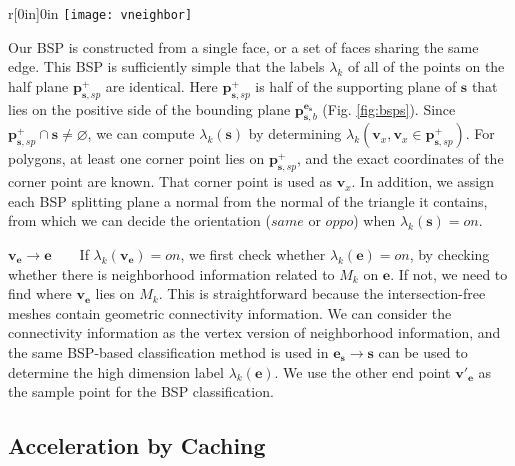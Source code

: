 %
\vspace{0.5em}
\begin{wrapfigure}{r}[0in]{0in}
 \texttt{[image: vneighbor]}
\end{wrapfigure}
Our BSP is constructed from a single face, or a set of faces sharing the same edge. This BSP is sufficiently simple that the labels $\lambda_k$ of all of the points on the half plane $\bm{p}_{\bm{s}, sp}^+$ are identical. Here $\bm{p}_{\bm{s}, sp}^+$ is half of the supporting plane of $\bm{s}$ that lies on the positive side of the bounding plane $\bm{p}_{\bm{s}, b}^{\bm{e}_{\bm{s}}}$ (Fig. \ref{fig:bsps}). Since $\bm{p}_{\bm{s}, sp}^+ \cap \bm{s} \neq \varnothing$, we can compute $\lambda_k(\bm{s})$ by determining $\lambda_k(\bm{v}_x, \bm{v}_x \in \bm{p}_{\bm{s}, sp}^+)$. For polygons, at least one corner point lies on $\bm{p}_{\bm{s}, sp}^+$, and the exact coordinates of the corner point are known. That corner point is used as $\bm{v}_x$. In addition, we assign each BSP splitting plane a normal from the normal of the triangle it contains, from which we can decide the orientation ($same$ or $oppo$) when $\lambda_k(\bm{s})=on$.


\noindent\textbf{$\bm{\bm{v}_{\bm{e}}\to e}$}~~~~If $\lambda_k(\bm{v}_{\bm{e}})=on$, we first check whether $\lambda_k(\bm{e}) = on$, by checking whether there is neighborhood information related to $M_k$ on $\bm{e}$. If not, we need to find where $\bm{v}_{\bm{e}}$ lies on $M_k$. This is straightforward because the intersection-free meshes contain geometric connectivity information. We can consider the connectivity information as the vertex version of neighborhood information, and the same BSP-based classification method is used in ${\bm{e}_{\bm{s}}\to \bm{s}}$ can be used to determine the high dimension label $\lambda_k(\bm{e})$. We use the other end point $\bm{v}'_{\bm{e}}$ as the sample point for the BSP classification.



\subsection{Acceleration by Caching}
\label{sec:acc}

